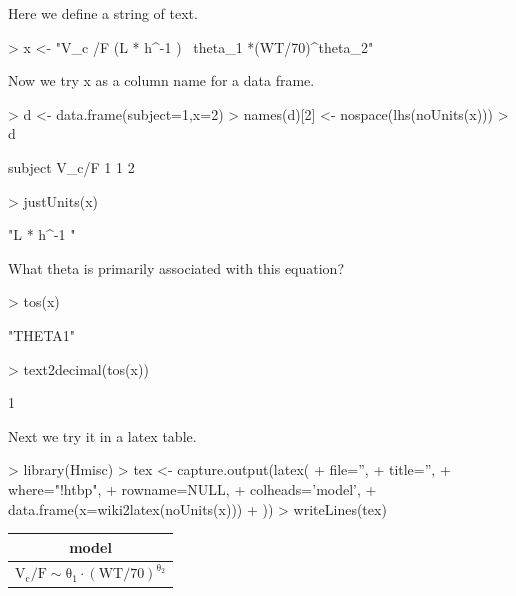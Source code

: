 \documentclass[titlepage]{article}
\begin{document}
Here we define a string of text.
\begin{Schunk}
\begin{Sinput}
> x <- "V_c /F (L * h^-1 ) ~theta_1 *(WT/70)^theta_2"
\end{Sinput}
\end{Schunk}
Now we try x as a column name for a data frame.
\begin{Schunk}
\begin{Sinput}
> d <- data.frame(subject=1,x=2)
> names(d)[2] <- nospace(lhs(noUnits(x)))
> d
\end{Sinput}
\begin{Soutput}
  subject V_c/F
1       1     2
\end{Soutput}
\begin{Sinput}
> justUnits(x)
\end{Sinput}
\begin{Soutput}
[1] "L * h^-1 "
\end{Soutput}
\end{Schunk}
What theta is primarily associated with this equation?
\begin{Schunk}
\begin{Sinput}
> tos(x)
\end{Sinput}
\begin{Soutput}
[1] "THETA1"
\end{Soutput}
\begin{Sinput}
> text2decimal(tos(x))
\end{Sinput}
\begin{Soutput}
[1] 1
\end{Soutput}
\end{Schunk}
Next we try it in a latex table.
\begin{Schunk}
\begin{Sinput}
> library(Hmisc)
> tex <- capture.output(latex(
+   file='',
+   title='',
+   where="!htbp",
+   rowname=NULL,
+   colheads='model',
+   data.frame(x=wiki2latex(noUnits(x)))
+ ))
> writeLines(tex)
\end{Sinput}
%
\begin{table}[!htbp]
 \begin{center}
 \begin{tabular}{l}\hline\hline
\multicolumn{1}{c}{model}\tabularnewline
\hline
$\mathrm{V_{c}/F  \sim\theta_{1}\cdot(WT/70)^{\theta_{2}}}$\tabularnewline
\hline
\end{tabular}

\end{center}

\end{table}\end{Schunk}
\end{document}
